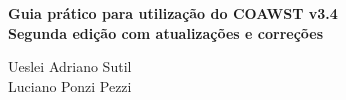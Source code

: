 \begingroup
\thispagestyle{empty}
\centering
\vspace*{7cm}
\par\normalfont\fontsize{30}{30}\sffamily\selectfont
\textbf{Guia prático para utilização do COAWST v3.4\\  \LARGE Segunda edição com atualizações e correções}\\
{\LARGE }\par %
\vspace*{1cm}
{\Huge Ueslei Adriano Sutil \\ Luciano Ponzi Pezzi}\par %
\endgroup
